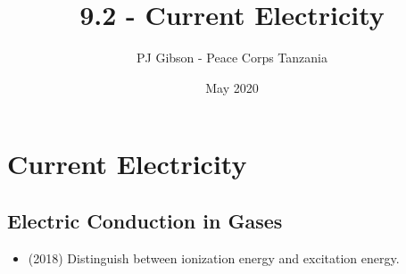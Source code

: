 \documentclass{article}
\title{9.2 - Current Electricity}
\author{PJ Gibson - Peace Corps Tanzania}
\date{May 2020}
\begin{document}
\maketitle


\section{Current Electricity}

\subsection{Electric Conduction in Gases}
\begin{itemize}
\item (2018)  Distinguish between ionization energy and excitation energy.
\end{itemize}
\end{document}
